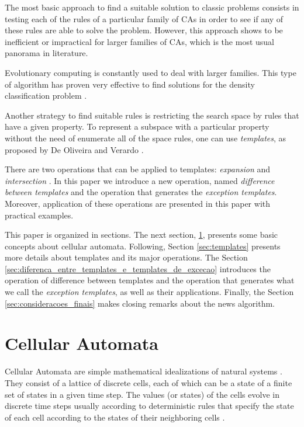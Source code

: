 \documentclass{llncs}
\begin{document}
The most basic approach to find a suitable solution to classic problems consists in testing each of the rules of a particular family of CAs in order to see if any of these rules are able to solve the problem. However, this approach shows to be inefficient or impractical for larger families of CAs, which is the most usual panorama in literature.

Evolutionary computing is constantly used to deal with larger families. This type of algorithm has proven very effective to find solutions for the density classification problem \cite{wolz2008very}.

Another strategy to find suitable rules is restricting the search space by rules that have a given property. To represent a subspace with a particular property without the need of enumerate all of the space rules, one can use \textit{templates}, as proposed by De Oliveira and Verardo  \cite{deOliveira2014,deOliveira2014b}.

There are two operations that can be applied to templates: \textit{expansion} and \textit{intersection} \cite{deOliveira2014,deOliveira2014b}. In this paper we introduce a new operation, named \textit{difference between templates} and the operation that generates the \textit{exception templates}. Moreover, application of these operations are presented in this paper with practical examples.

This paper is organized in sections. The next section, \ref{sec:automatos_celulares}, presents some basic concepts about cellular automata. Following, Section \ref{sec:templates} presents more details about templates and its major operations. The Section \ref{sec:diferenca_entre_templates_e_templates_de_excecao} introduces the operation of difference between templates and the operation that generates what we call the \textit{exception templates}, as well as their applications. Finally, the Section \ref{sec:consideracoes_finais} makes closing remarks about the news algorithm.

\section{Cellular Automata}
\label{sec:automatos_celulares}
Cellular Automata are simple mathematical idealizations of natural systems \cite{wolfram1994cellular}. They consist of a lattice of discrete cells, each of which can be a state of a finite set of states in a given time step. The values (or states) of the cells evolve in discrete time steps usually according to deterministic rules that specify the state of each cell according to the states of their neighboring cells \cite{wolfram1994cellular}.
\end{document}
